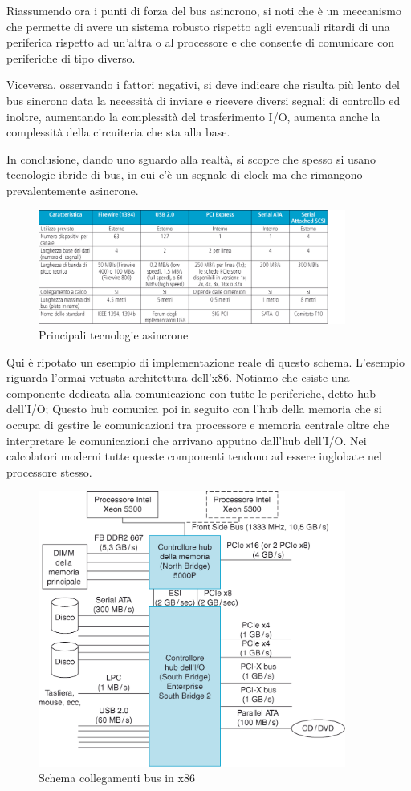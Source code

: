 \documentclass[class=book, crop=false, oneside]{standalone}
\begin{document}
Riassumendo ora i punti di forza del bus asincrono, si noti che è un meccanismo che permette di avere un sistema robusto rispetto agli eventuali ritardi di una periferica rispetto ad un'altra o al processore e che consente di comunicare con periferiche di tipo diverso.

Viceversa, osservando i fattori negativi, si deve indicare che risulta più lento del bus sincrono data la necessità di inviare e ricevere diversi segnali di controllo ed inoltre, aumentando la complessità del trasferimento I/O, aumenta anche la complessità della circuiteria che sta alla base.

In conclusione, dando uno sguardo alla realtà, si scopre che spesso si usano tecnologie ibride di bus, in cui c'è un segnale di clock ma che rimangono prevalentemente asincrone.

\begin{figure}[!h]
	\centering
	\includegraphics[width=0.9\textwidth,keepaspectratio]{tecnologie-asincrone}
	\caption{Principali tecnologie asincrone}
\end{figure}
Qui è ripotato un esempio di implementazione reale di questo schema. L'esempio riguarda l'ormai vetusta architettura dell'x86. Notiamo che esiste una componente dedicata alla comunicazione con tutte le periferiche, detto hub dell'I/O; Questo hub comunica poi in seguito con l'hub della memoria che si occupa di gestire le comunicazioni tra processore e memoria centrale oltre che interpretare le comunicazioni che arrivano apputno dall'hub dell'I/O.
Nei calcolatori moderni tutte queste componenti tendono ad essere inglobate nel processore stesso.
\begin{figure}[!h]
	\centering
	\includegraphics[width=0.9\textwidth,keepaspectratio]{esempio-x86}
	\caption{Schema collegamenti bus in x86}
\end{figure}
\end{document}
